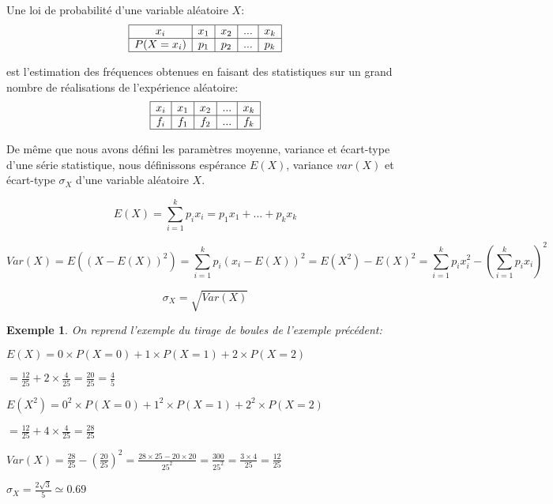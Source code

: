 \documentclass[a4paper,11pt]{article}
\theoremstyle{break}
\newcounter{enonce}
\newtheorem{exemple}[enonce]{Exemple}
\begin{document}
Une loi de probabilité d'une variable aléatoire $X$:
 $$
\begin{array}{|c|c|c|c|c|}

\hline
    x_i&x_1&x_2&...&x_k\\
    \hline
    P(X=x_i)&p_1&p_2&...&p_k\\
    \hline
    \end{array} 
$$ 

est l'estimation des fréquences obtenues en faisant des statistiques sur un grand
nombre de réalisations de l'expérience aléatoire:
 $$
\begin{array}{|c|c|c|c|c|}

\hline
    x_i&x_1&x_2&...&x_k\\
    \hline
    f_i&f_1&f_2&...&f_k\\
    \hline
    \end{array} 
$$ 
 
De même que nous avons défini les paramètres moyenne, variance et écart-type d'une série statistique, 
nous définissons espérance $E(X)$, variance $var(X)$ et écart-type $\sigma_X$ d'une variable aléatoire $X$.

  \begin{definition} 
    
   $$E(X)=\sum_{i=1}^k p_i x_i=p_1 x_1+...+p_k x_k$$
   
   $$Var(X)=E((X-E(X))^2)=\sum_{i=1}^k p_i (x_i-E(X))^2=E(X^2)-E(X)^2=\sum_{i=1}^k p_i x_i^2-(\sum_{i=1}^k p_i x_i)^2$$
   
   $$\sigma_X=\sqrt{Var(X)}$$
   \end{definition}
   
     \begin{exemple}
    
    On reprend l'exemple du tirage de boules de l'exemple précédent:
    
    $E(X)=0 \times P(X=0)+1 \times P(X=1)+2 \times P(X=2)$
    
    $=\frac{12}{25}+2 \times \frac{4}{25}=\frac{20}{25}
    =\frac{4}{5}$
    
    $E(X^2)=0^2 \times P(X=0)+1^2 \times P(X=1)+2^2 \times P(X=2)$
    
    $=\frac{12}{25}+4 \times \frac{4}{25}=\frac{28}{25}$
    
    $Var(X)=\frac{28}{25}-(\frac{20}{25})^2=\frac{28\times 25- 20 \times 20}{25^2}=\frac{300}{25^2}
    =\frac{3\times 4}{25}=\frac{12}{25}$
    
    $\sigma_X=\frac{2\sqrt{3}}{5}\simeq 0.69$
   \end{exemple}
\end{document}
